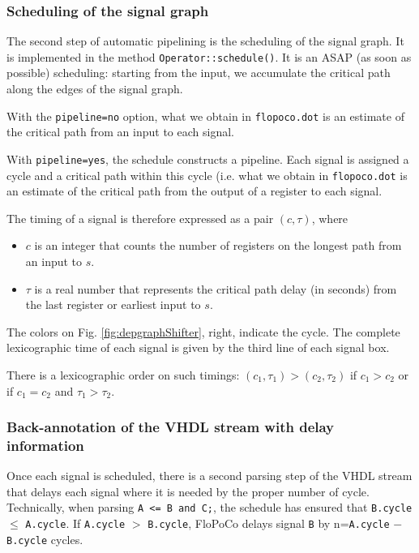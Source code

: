 \documentclass{article}
\begin{document}
\subsubsection{Scheduling of the signal graph}\label{sec:scheduling}
The second step of automatic pipelining is the scheduling of the signal graph.
It is implemented in the method \texttt{Operator::schedule()}.
It is an ASAP (as soon as possible) scheduling: starting from the input, we accumulate the critical path along the edges of the signal graph.

With the \texttt{pipeline=no} option, what we obtain in \texttt{flopoco.dot} is an estimate of the critical path from an input to each signal.


With \texttt{pipeline=yes}, the schedule constructs a pipeline.
Each signal is assigned a cycle and a critical path within this cycle (i.e. what we obtain in \texttt{flopoco.dot} is an estimate of the critical path from the output of a register to each signal.

The timing of a signal is therefore expressed as a pair $(c, \tau)$, where
\begin{itemize}
\item $c$ is an integer that counts the number of registers
  on the longest path from an input to $s$.
\item $\tau$ is a real number that represents the critical path delay (in seconds)
  from the last register or earliest input to $s$.
\end{itemize}

The colors on Fig. \ref{fig:depgraphShifter}, right,  indicate the cycle.
The complete lexicographic time of each signal is given by the third line of each signal box. 

There is a lexicographic order on such timings: $(c_1, \tau_1) > (c_2, \tau_2)$ if $c_1 > c_2$ or if $c_1 = c_2$ and $\tau_1 > \tau_2$.

\subsubsection{Back-annotation of the VHDL stream with delay information}
Once each signal is scheduled, there is a second parsing step of the VHDL stream that delays each signal where it is needed by the proper number of cycle.
Technically, when parsing
\verb!A <= B and C;!, the schedule has ensured that  \verb!B.cycle!$\le$ \verb!A.cycle!.
If \verb!A.cycle! $>$ \verb!B.cycle!, FloPoCo delays
signal \verb!B! by n=\verb!A.cycle! $-$ \verb!B.cycle! cycles.
\end{document}
